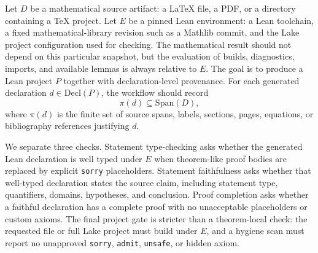 \documentclass{article}
\newcommand{\lean}{Lean\xspace}
\newcommand{\mathlib}{Mathlib\xspace}
\begin{document}
Let $D$ be a mathematical source artifact: a \LaTeX{} file, a PDF, or a directory containing a \TeX{} project.
Let $E$ be a pinned \lean environment: a Lean toolchain, a fixed mathematical-library revision such as a \mathlib commit, and the Lake project configuration used for checking.
The mathematical result should not depend on this particular snapshot, but the evaluation of builds, diagnostics, imports, and available lemmas is always relative to $E$.
The goal is to produce a \lean project $P$ together with declaration-level provenance.
For each generated declaration $d \in \mathrm{Decl}(P)$, the workflow should record
\[
  \pi(d) \subseteq \mathrm{Span}(D),
\]
where $\pi(d)$ is the finite set of source spans, labels, sections, pages, equations, or bibliography references  justifying $d$.

We separate three checks.
Statement type-checking asks whether the generated \lean declaration is well typed under $E$ when theorem-like proof bodies are replaced by explicit \texttt{sorry} placeholders.
Statement faithfulness asks whether that well-typed declaration states the source claim, including statement type, quantifiers, domains, hypotheses, and conclusion.
Proof completion asks whether a faithful declaration has a complete proof with no unacceptable placeholders or custom axioms.
The final project gate is stricter than a theorem-local check: the requested file or full Lake project must build under $E$, and a hygiene scan must report no unapproved \texttt{sorry}, \texttt{admit}, \texttt{unsafe}, or hidden axiom.
\end{document}

